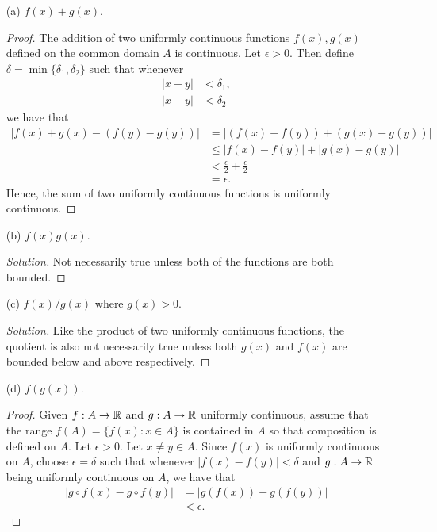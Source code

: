 \begin{enumerate}
    \item[(a)] \( f(x) + g(x) \).
        \begin{proof}
        The addition of two uniformly continuous functions \( f(x), g(x) \) defined on the common domain \( A  \) is continuous. Let \( \epsilon > 0  \). Then define \( \delta = \min \{ \delta_1, \delta_2  \}  \) such that whenever 
        \begin{align*}
            | x - y  | &< \delta_1,  \\
            | x - y  | &< \delta_2 
        \end{align*}
        we have that 
        \begin{align*}
            | f(x) + g(x) - (f(y) - g(y)) | &= | (f(x) - f(y)) + (g(x) - g(y)) |  \\
                                            &\leq | f(x) - f(y)  | + | g(x) - g(y) | \\
                                            &< \frac{ \epsilon  }{ 2 } + \frac{ \epsilon  }{ 2 } \\
                                            &= \epsilon.
        \end{align*}
        Hence, the sum of two uniformly continuous functions is uniformly continuous.
        \end{proof}
    \item[(b)] \( f(x)g(x) \).
        \begin{proof}[Solution]
        Not necessarily true unless both of the functions are both bounded.

        \end{proof}
    \item[(c)] \( f(x) / g(x)  \) where \( g(x) > 0  \).
        \begin{proof}[Solution]
        Like the product of two uniformly continuous functions, the quotient is also not necessarily true unless both \( g(x) \) and \( f(x) \) are bounded below and above respectively.
        \end{proof}
    \item[(d)] \( f(g(x))  \).
        \begin{proof}
        Given \( f: A \to \mathbb{R}  \) and \( g:  A \to \mathbb{R}  \) uniformly continuous, assume that the range \( f(A) = \{ f(x) : x \in A  \}  \) is contained in \( A  \) so that composition is defined on \( A  \). Let \( \epsilon > 0  \). Let \( x \neq y \in A  \). Since \( f(x) \) is uniformly continuous on \( A  \), choose \( \epsilon  = \delta   \) such that whenever \( | f(x) - f(y)  | < \delta  \) and \( g : A \to \mathbb{R}  \) being uniformly continuous on \( A  \), we have that
        \begin{align*}
            | g \circ f (x) - g \circ f(y) | &= | g(f(x)) - g(f(y)) |  \\
                                             &< \epsilon.
        \end{align*}
        \end{proof}
\end{enumerate}


